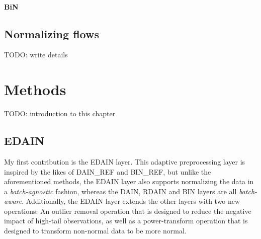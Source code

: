 \documentclass{statsmsc}
\begin{document}
\subsubsection{BiN}%
\label{ssub:BiN}






\section{Normalizing flows}%
\label{sec:Normalizing flows}

TODO: write details



\chapter{Methods} %

TODO: introduction to this chapter

\section{EDAIN}%
\label{sec:EDAIN}


My first contribution is the \ac{EDAIN} layer. This adaptive preprocessing layer is inspired
by the likes of DAIN\_REF and BIN\_REF, but unlike the aforementioned methods, the
\ac{EDAIN} layer also supports normalizing the data in a \textit{batch-agnostic} fashion, whereas
the \ac{DAIN}, \ac{RDAIN} and \ac{BIN} layers are all \textit{batch-aware}.
Additionally, the \ac{EDAIN} layer extends the other layers with two new operations: An outlier
removal operation that is designed to reduce the negative impact of high-tail observations,
as well as a power-transform operation that is designed to transform non-normal data to be more
normal.
\end{document}
